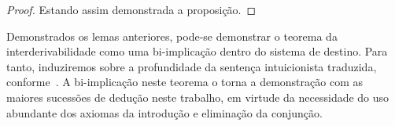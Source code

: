 \begin{tcolorbox}[enhanced jigsaw, breakable, sharp corners, colframe=black, colback=white, boxrule=0.5pt, left=1.5mm, right=1.5mm, top=1.5mm, bottom=1.5mm]
\begin{lemma}
\begin{proof}
        \vspace{0.5\baselineskip}
        Estando assim demonstrada a proposição.
        \end{proof}
    \end{lemma}
\end{tcolorbox}

\vspace{.5\baselineskip}
Demonstrados os lemas anteriores, pode-se demonstrar o teorema da interderivabilidade como uma bi-implicação dentro do sistema de destino.
Para tanto, induziremos sobre a profundidade da sentença intuicionista traduzida, conforme~\cite{Troelstra}.
A bi-implicação neste teorema o torna a demonstração com as maiores sucessões de dedução neste trabalho, em virtude da necessidade do uso abundante dos axiomas da introdução e eliminação da conjunção.

